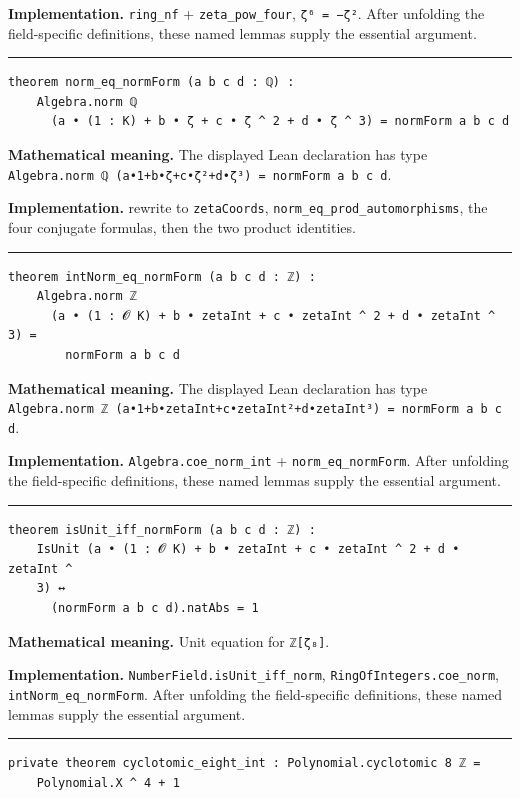 \documentclass[UTF8,a4paper,11pt,fontset=fandol]{ctexart}
\theoremstyle{definition}
\newcommand{\statementsep}{\par\medskip\hrule\medskip}
\begin{document}
\noindent\textbf{Implementation.} \texttt{ring\_\allowbreak{}nf} + \texttt{zeta\_\allowbreak{}pow\_\allowbreak{}four}, \texttt{ζ⁶ = −ζ²}. After unfolding the field-specific definitions, these named lemmas supply the essential argument.\par
\statementsep
\begin{verbatim}
theorem norm_eq_normForm (a b c d : ℚ) :
    Algebra.norm ℚ
      (a • (1 : K) + b • ζ + c • ζ ^ 2 + d • ζ ^ 3) = normForm a b c d
\end{verbatim}
\noindent\textbf{Mathematical meaning.} The displayed Lean declaration has type \texttt{Algebra.\allowbreak{}norm ℚ (a•1+b•ζ+c•ζ²+d•ζ³) = normForm a b c d}.\par
\noindent\textbf{Implementation.} rewrite to \texttt{zetaCoords}, \texttt{norm\_\allowbreak{}eq\_\allowbreak{}prod\_\allowbreak{}automorphisms}, the four conjugate formulas, then the two product identities.\par
\statementsep
\begin{verbatim}
theorem intNorm_eq_normForm (a b c d : ℤ) :
    Algebra.norm ℤ
      (a • (1 : 𝓞 K) + b • zetaInt + c • zetaInt ^ 2 + d • zetaInt ^ 3) =
        normForm a b c d
\end{verbatim}
\noindent\textbf{Mathematical meaning.} The displayed Lean declaration has type \texttt{Algebra.\allowbreak{}norm ℤ (a•1+b•zetaInt+c•zetaInt²+d•zetaInt³) = normForm a b c d}.\par
\noindent\textbf{Implementation.} \texttt{Algebra.\allowbreak{}coe\_\allowbreak{}norm\_\allowbreak{}int} + \texttt{norm\_\allowbreak{}eq\_\allowbreak{}normForm}. After unfolding the field-specific definitions, these named lemmas supply the essential argument.\par
\statementsep
\begin{verbatim}
theorem isUnit_iff_normForm (a b c d : ℤ) :
    IsUnit (a • (1 : 𝓞 K) + b • zetaInt + c • zetaInt ^ 2 + d • zetaInt ^
    3) ↔
      (normForm a b c d).natAbs = 1
\end{verbatim}
\noindent\textbf{Mathematical meaning.} Unit equation for \texttt{ℤ[ζ₈]}.\par
\noindent\textbf{Implementation.} \texttt{NumberField.\allowbreak{}isUnit\_\allowbreak{}iff\_\allowbreak{}norm}, \texttt{RingOfIntegers.\allowbreak{}coe\_\allowbreak{}norm}, \texttt{intNorm\_\allowbreak{}eq\_\allowbreak{}normForm}. After unfolding the field-specific definitions, these named lemmas supply the essential argument.\par
\statementsep
\begin{verbatim}
private theorem cyclotomic_eight_int : Polynomial.cyclotomic 8 ℤ =
    Polynomial.X ^ 4 + 1
\end{verbatim}
\end{document}
